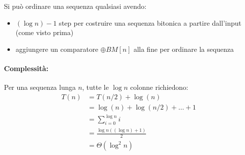 Si può ordinare una sequenza qualsiasi avendo: 
\begin{itemize}
    \item $(\log n) - 1$ step per costruire una sequenza bitonica a partire dall'input (come visto prima)
    
    \item aggiungere un comparatore $\oplus BM [n]$ alla fine per ordinare la sequenza
\end{itemize}

\paragraph{Complessità:} Per una sequenza lunga $n$, tutte le $\log n$ colonne richiedono: 
\begin{align*}
    T(n) & = T(n/2) + \log (n) \\
    & = \log (n) + \log (n/2) + \dots + 1 \\
    & = \sum_{i=0}^{\log n} i \\
    & = \frac{\log n \left((\log n) + 1\right)}{2} \\
    & = \Theta (\log^2 n) 
\end{align*}
